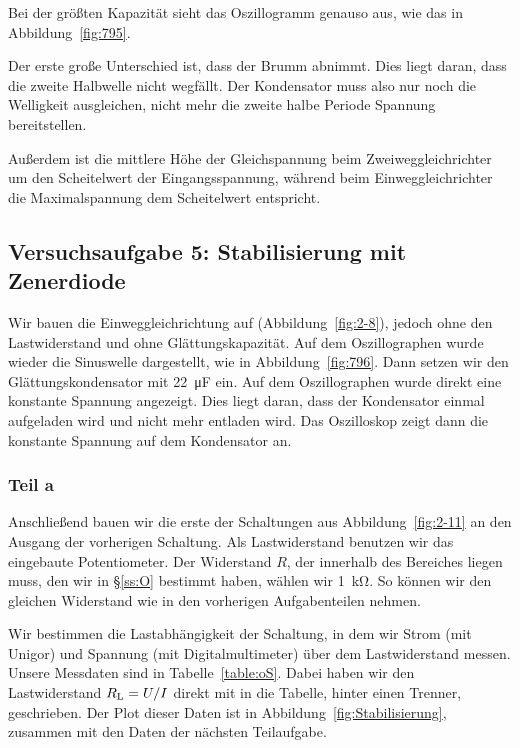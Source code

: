 Bei der größten Kapazität sieht das Oszillogramm genauso aus, wie das in
Abbildung~\ref{fig:795}.

Der erste große Unterschied ist, dass der Brumm abnimmt. Dies liegt daran,
dass die zweite Halbwelle nicht wegfällt. Der Kondensator muss also nur noch
die Welligkeit ausgleichen, nicht mehr die zweite halbe Periode Spannung
bereitstellen.

Außerdem ist die mittlere Höhe der Gleichspannung beim Zweiweggleichrichter um
den Scheitelwert der Eingangsspannung, während beim Einweggleichrichter die
Maximalspannung dem Scheitelwert entspricht.

\FloatBarrier
\subsection{Versuchsaufgabe 5: Stabilisierung mit Zenerdiode}

Wir bauen die Einweggleichrichtung auf (Abbildung~\ref{fig:2-8}), jedoch ohne
den Lastwiderstand und ohne Glättungskapazität. Auf dem Oszillographen wurde
wieder die Sinuswelle dargestellt, wie in Abbildung~\ref{fig:796}. Dann setzen
wir den Glättungskondensator mit \SI{22}{\micro\farad} ein. Auf dem
Oszillographen wurde direkt eine konstante Spannung angezeigt. Dies liegt
daran, dass der Kondensator einmal aufgeladen wird und nicht mehr entladen
wird. Das Oszilloskop zeigt dann die konstante Spannung auf dem Kondensator an.

\subsubsection{Teil a}

Anschließend bauen wir die erste der Schaltungen aus Abbildung~\ref{fig:2-11}
an den Ausgang der vorherigen Schaltung. Als Lastwiderstand benutzen wir das
eingebaute Potentiometer. Der Widerstand $R$, der innerhalb des Bereiches
liegen muss, den wir in §\ref{ss:O} bestimmt haben, wählen wir
\SI{1}{\kilo\ohm}. So können wir den gleichen Widerstand wie in den vorherigen
Aufgabenteilen nehmen.

Wir bestimmen die Lastabhängigkeit der Schaltung, in dem wir Strom (mit
Unigor) und Spannung (mit Digitalmultimeter) über dem Lastwiderstand messen.
Unsere Messdaten sind in Tabelle~\ref{table:oS}. Dabei haben wir den
Lastwiderstand $R_\text L = U / I$ direkt mit in die Tabelle, hinter einen
Trenner, geschrieben. Der Plot dieser Daten ist in
Abbildung~\ref{fig:Stabilisierung}, zusammen mit den Daten der nächsten
Teilaufgabe.


